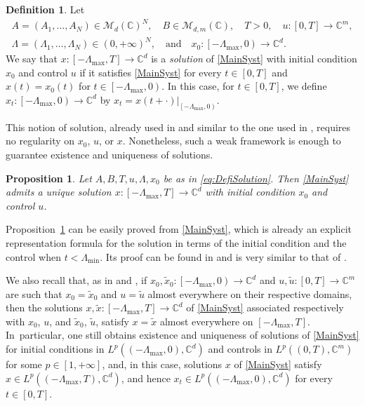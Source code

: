 \documentclass[10pt]{article}
\theoremstyle{plain}
\newtheorem{prop}[theo]{Proposition}
\theoremstyle{definition}
\newtheorem{defi}[theo]{Definition}
\numberwithin{equation}{section}\numberwithin{figure}{section}\emergencystretch=3em
\begin{document}
\begin{defi}
\label{DefiSolution}
Let
\begin{equation}\label{eq:DefiSolution}
\begin{gathered}
A = (A_1, \dots, A_N) \in \mathcal M_d(\mathbb C)^N,\quad B \in \mathcal M_{d, m}(\mathbb C),\quad T > 0,\quad
u: [0, T] \to \mathbb C^m,\\
\Lambda = (\Lambda_1, \dots, \Lambda_N) \in (0, +\infty)^N,\quad \text{and}\quad x_0: \left[-\Lambda_{\max}, 0\right) \to \mathbb C^d.
\end{gathered}
\end{equation}
We say that $x: \left[-\Lambda_{\max}, T\right] \to \mathbb C^d$ is a \emph{solution} of \eqref{MainSyst} with initial condition $x_0$ and control $u$ if it satisfies \eqref{MainSyst} for every $t \in [0, T]$ and $x(t) = x_0(t)$ for $t \in \left[-\Lambda_{\max}, 0\right)$. In this case, for $t \in [0, T]$, we define $x_t: \left[-\Lambda_{\max}, 0\right) \to \mathbb C^d$ by $x_t = x(t + \cdot)|_{\left[-\Lambda_{\max}, 0\right)}$.
\end{defi}

This notion of solution, already used in \cite{Mazanti2017Relative} and similar to the one used in \cite{Chitour2016Stability}, requires no regularity on $x_0$, $u$, or $x$. Nonetheless, such a weak framework is enough to guarantee existence and uniqueness of solutions.

\begin{prop}
\label{PropControlDelayExistUnique}
Let $A,B,T,u,\Lambda,x_0$ be as in \eqref{eq:DefiSolution}. Then \eqref{MainSyst} admits a unique solution $x: \left[-\Lambda_{\max}, T\right] \to \mathbb C^d$ with initial condition $x_0$ and control $u$.
\end{prop}

Proposition~\ref{PropControlDelayExistUnique} can be easily proved from \eqref{MainSyst}, which is already an explicit representation formula for the solution in terms of the initial condition and the control when $t < \Lambda_{\min}$. Its proof can be found in \cite[Prop.\,2.2]{Mazanti2017Relative} and is very similar to that of \cite[Prop.\,3.2]{Chitour2016Stability}.

We also recall that, as in \cite[Rem.\,3.4]{Chitour2016Stability} and \cite[Rem.\,2.3]{Mazanti2017Relative}, if $x_0, \widetilde x_0: \left[-\Lambda_{\max}, 0\right) \to \mathbb C^d$ and $u, \widetilde u: [0, T] \to \mathbb C^m$ are such that $x_0 = \widetilde x_0$ and $u = \widetilde u$ almost everywhere on their respective domains, then the solutions $x, \widetilde x: \left[-\Lambda_{\max}, T\right] \to \mathbb C^d$ of \eqref{MainSyst} associated respectively with $x_0$, $u$, and $\widetilde x_0$, $\widetilde u$, satisfy $x = \widetilde x$ almost everywhere on $\left[-\Lambda_{\max}, T\right]$. In~particular, one still obtains existence and uniqueness of solutions of \eqref{MainSyst} for initial conditions in $L^p((-\Lambda_{\max}, 0), \mathbb C^d)$ and controls in $L^p((0, T), \mathbb C^m)$ for some $p \in [1, +\infty]$, and, in this case, solutions $x$ of \eqref{MainSyst} satisfy $x \in L^p(\left(-\Lambda_{\max}, T\right), \mathbb C^d)$, and hence $x_t \in L^p((-\Lambda_{\max}, 0), \mathbb C^d)$ for every $t \in [0, T]$.
\end{document}
